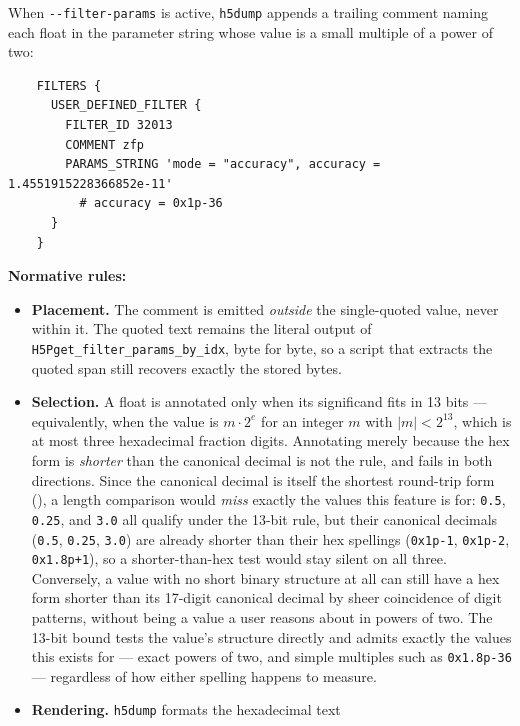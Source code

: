 \documentclass[../RFC-HDFG-2026-001.tex]{subfiles}
\begin{document}
When \texttt{-{}-filter-params} is active, \texttt{h5dump} appends a trailing comment
naming each float in the parameter string whose value is a small multiple
of a power of two:

\begin{verbatim}
    FILTERS {
      USER_DEFINED_FILTER {
        FILTER_ID 32013
        COMMENT zfp
        PARAMS_STRING 'mode = "accuracy", accuracy = 1.4551915228366852e-11'
          # accuracy = 0x1p-36
      }
    }
\end{verbatim}

\begin{notebox}
\textbf{Normative rules:}
\begin{itemize}
  \item \textbf{Placement.}  The comment is emitted \emph{outside} the
    single-quoted value, never within it.  The quoted text remains the
    literal output of \texttt{H5Pget\_filter\_params\_by\_idx}, byte for
    byte, so a script that extracts the quoted span still recovers exactly
    the stored bytes.
  \item \textbf{Selection.}  A float is annotated only when its significand
    fits in 13 bits --- equivalently, when the value is $m \cdot 2^{e}$ for
    an integer $m$ with $|m| < 2^{13}$, which is at most three hexadecimal
    fraction digits.  Annotating merely because the hex form is
    \emph{shorter} than the canonical decimal is not the rule, and fails in
    both directions.  Since the canonical decimal is itself the shortest
    round-trip form (), a length comparison
    would \emph{miss} exactly the values this feature is for: \texttt{0.5},
    \texttt{0.25}, and \texttt{3.0} all qualify under the 13-bit rule, but
    their canonical decimals (\texttt{0.5}, \texttt{0.25}, \texttt{3.0}) are
    already shorter than their hex spellings
    (\texttt{0x1p-1}, \texttt{0x1p-2}, \texttt{0x1.8p+1}), so a
    shorter-than-hex test would stay silent on all three.  Conversely, a
    value with no short binary structure at all can still have a hex form
    shorter than its 17-digit canonical decimal by sheer coincidence of
    digit patterns, without being a value a user reasons about in powers of
    two.  The 13-bit bound tests the value's structure directly and admits
    exactly the values this exists for --- exact powers of two, and simple
    multiples such as \texttt{0x1.8p-36} --- regardless of how either
    spelling happens to measure.
  \item \textbf{Rendering.}  \texttt{h5dump} formats the hexadecimal text

\end{itemize}
\end{notebox}
\end{document}

